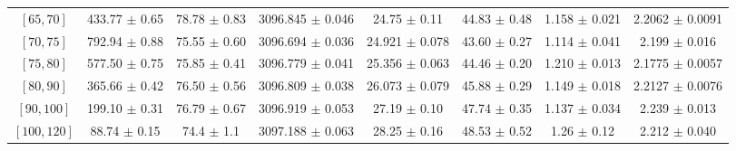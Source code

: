 \begin{tabular}{c||c|c|c|c|c|c|c}
$[65, 70]$ & 433.77 $\pm$ 0.65 & 78.78 $\pm$ 0.83 & 3096.845 $\pm$ 0.046 & 24.75 $\pm$ 0.11 & 44.83 $\pm$ 0.48 & 1.158 $\pm$ 0.021 & 2.2062 $\pm$ 0.0091\\
$[70, 75]$ & 792.94 $\pm$ 0.88 & 75.55 $\pm$ 0.60 & 3096.694 $\pm$ 0.036 & 24.921 $\pm$ 0.078 & 43.60 $\pm$ 0.27 & 1.114 $\pm$ 0.041 & 2.199 $\pm$ 0.016\\
$[75, 80]$ & 577.50 $\pm$ 0.75 & 75.85 $\pm$ 0.41 & 3096.779 $\pm$ 0.041 & 25.356 $\pm$ 0.063 & 44.46 $\pm$ 0.20 & 1.210 $\pm$ 0.013 & 2.1775 $\pm$ 0.0057\\
$[80, 90]$ & 365.66 $\pm$ 0.42 & 76.50 $\pm$ 0.56 & 3096.809 $\pm$ 0.038 & 26.073 $\pm$ 0.079 & 45.88 $\pm$ 0.29 & 1.149 $\pm$ 0.018 & 2.2127 $\pm$ 0.0076\\
$[90, 100]$ & 199.10 $\pm$ 0.31 & 76.79 $\pm$ 0.67 & 3096.919 $\pm$ 0.053 & 27.19 $\pm$ 0.10 & 47.74 $\pm$ 0.35 & 1.137 $\pm$ 0.034 & 2.239 $\pm$ 0.013\\
$[100, 120]$ & 88.74 $\pm$ 0.15 & 74.4 $\pm$ 1.1 & 3097.188 $\pm$ 0.063 & 28.25 $\pm$ 0.16 & 48.53 $\pm$ 0.52 & 1.26 $\pm$ 0.12 & 2.212 $\pm$ 0.040\\
\end{tabular}
